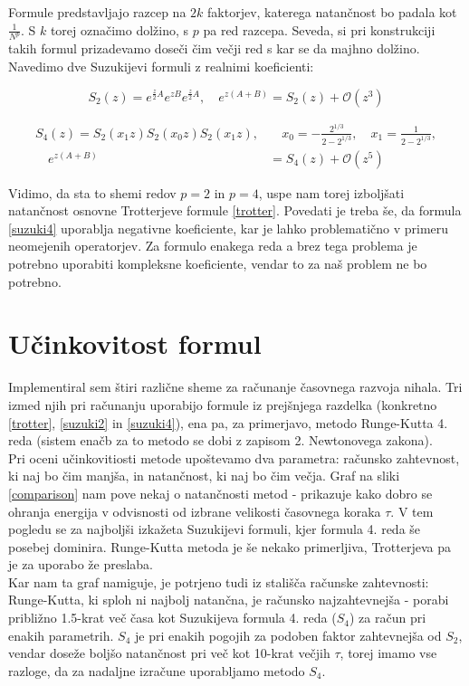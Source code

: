 \documentclass[a4paper]{article}
\newcommand{\bigO}[1]{\mathcal{O}\left( #1 \right)}
\begin{document}
    Formule predstavljajo razcep na $2k$ faktorjev, katerega natančnost bo padala kot $\frac{1}{N^p}$. S $k$ torej označimo dolžino, s $p$
    pa red razcepa. Seveda, si pri konstrukciji takih formul prizadevamo doseči čim večji red s kar se da majhno dolžino. Navedimo dve Suzukijevi
    formuli z realnimi koeficienti:

    \begin{equation}\label{suzuki2}
        S_2(z) = e^{\frac{z}{2}A} e^{zB} e^{\frac{z}{2}A}, \quad e^{z(A + B)} = S_2(z) + \bigO{z^{3}}
    \end{equation}

    \begin{equation}\label{suzuki4}
        \begin{split}
            S_4(z) = S_2(x_1z)S_2(x_0z)S_2(x_1z),& \quad x_0 = -\frac{2^{1/3}}{2 - 2^{1/3}}, \quad x_1 = \frac{1}{2 - 2^{1/3}}, \\
            \quad e^{z(A + B)} &= S_4(z) + \bigO{z^{5}}
        \end{split}
    \end{equation}

    Vidimo, da sta to shemi redov $p = 2$ in $p = 4$, uspe nam torej izboljšati natančnost osnovne Trotterjeve formule \ref{trotter}. Povedati je
    treba še, da formula \ref{suzuki4} uporablja negativne koeficiente, kar je lahko problematično v primeru neomejenih operatorjev. Za formulo
    enakega reda a brez tega problema je potrebno uporabiti kompleksne koeficiente, vendar to za naš problem ne bo potrebno.

    \section{Učinkovitost formul}

    Implementiral sem štiri različne sheme za računanje časovnega razvoja nihala. Tri izmed njih pri računanju uporabijo formule iz prejšnjega
    razdelka (konkretno \ref{trotter}, \ref{suzuki2} in \ref{suzuki4}), ena pa, za primerjavo, metodo Runge-Kutta 4. reda (sistem enačb za to metodo
    se dobi z zapisom 2. Newtonovega zakona). \\
    Pri oceni učinkovitiosti metode upoštevamo dva parametra: računsko zahtevnost, ki naj bo čim manjša, in natančnost, ki naj bo čim večja.
    Graf na sliki \ref{comparison} nam pove nekaj o natančnosti metod - prikazuje kako dobro se ohranja energija v odvisnosti od izbrane velikosti
    časovnega koraka $\tau$. V tem pogledu se za najboljši izkažeta Suzukijevi formuli, kjer formula 4. reda še posebej dominira. Runge-Kutta metoda
    je še nekako primerljiva, Trotterjeva pa je za uporabo že preslaba. \\
    Kar nam ta graf namiguje, je potrjeno tudi iz stališča računske zahtevnosti: Runge-Kutta, ki sploh ni najbolj natančna, je računsko najzahtevnejša
    - porabi približno 1.5-krat več časa kot Suzukijeva formula 4. reda ($S_4$) za račun pri enakih parametrih. $S_4$ je pri enakih pogojih za podoben
    faktor zahtevnejša od $S_2$, vendar doseže boljšo natančnost pri več kot 10-krat večjih $\tau$, torej imamo vse razloge, da za nadaljne izračune
    uporabljamo metodo $S_4$.
\end{document}
